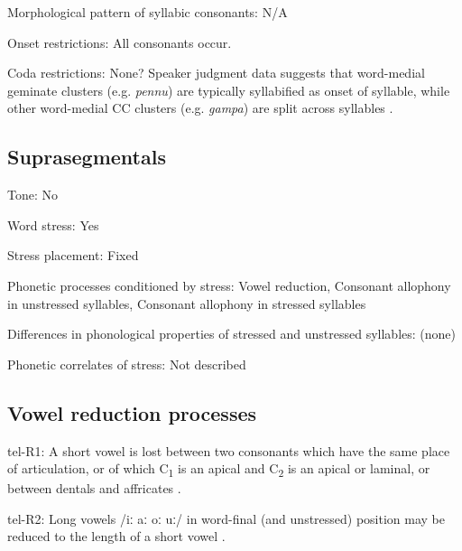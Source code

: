 {\begin{appendixdesc}
\item[Morphological pattern of syllabic consonants:] N/A

\item[Onset restrictions:] All consonants occur. 

\item[Coda restrictions:] None? Speaker judgment data suggests that word-medial geminate clusters (e.g. \textit{pennu}) are typically syllabified as onset of syllable, while other word-medial CC clusters (e.g. \textit{gampa}) are split across syllables \citep{Sailaja1999}.
\end{appendixdesc}
\subsection*{Suprasegmentals}
\begin{appendixdesc}
\item[Tone:] No

\item[Word stress:] Yes

\item[Stress placement:] Fixed

\item[Phonetic processes conditioned by stress:] Vowel reduction, Consonant allophony in unstressed syllables, Consonant allophony in stressed syllables

\item[Differences in phonological properties of stressed and unstressed syllables:] (none)

\item[Phonetic correlates of stress:] Not described
\end{appendixdesc}
\subsection*{Vowel reduction processes}
\begin{appendixdesc}

\item[tel-R1:] A short vowel is lost between two consonants which have the same place of articulation, or of which C\textsubscript{1} is an apical and C\textsubscript{2} is an apical or laminal, or between dentals and affricates \citep[9]{KostićEtAl1977}.

\item[tel-R2:] Long vowels /iː aː oː uː/ in word-final (and unstressed) position may be reduced to the length of a short vowel \citep[11--52]{KostićEtAl1977}.


\end{appendixdesc}}
